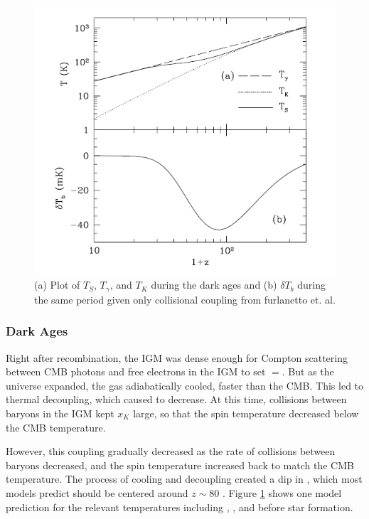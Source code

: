 \begin{figure}[htb]
\begin{center}
\includegraphics[width=0.95\linewidth]{Introduction/figures/dark_ages_global_spectrum.jpg}
\caption{(a) Plot of $T_S$, $T_\gamma$, and $T_K$ during the dark ages and (b) $\delta T_b$ during the same period given only collisional coupling from furlanetto et. al. \cite{furlanetto_2006}}
\label{Fig:da_global}
\end{center}
\end{figure}

\subsubsection{Dark Ages}
Right after recombination, the IGM was dense enough for Compton scattering between CMB photons and free electrons in the IGM to set \tk$=$\tg. But as the universe expanded, the gas adiabatically cooled, faster than the CMB. This led to thermal decoupling, which caused \tk to decrease. At this time, collisions between baryons in the IGM kept $x_K$ large, so that the spin temperature decreased below the CMB temperature. 

However, this coupling gradually decreased as the rate of collisions between baryons decreased, and the spin temperature increased back to match the CMB temperature. The process of cooling and decoupling created a dip in \ts, which most models predict should be centered around $z \sim 80 $ \cite{furlanetto_2006}. Figure \ref{Fig:da_global} shows one model prediction for the relevant temperatures including \tg, \tk, \ts and \dtb before star formation. 

